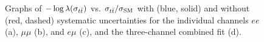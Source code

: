 \begin{figure}[htbp]
  \begin{center}
     \\
     \\
    \caption{Graphs of $-\log\lambda(\sigma_{t\bar{t}})$ vs. $\sigma_{t\bar{t}}/\sigma_{\rm SM}$ with (blue, solid) and without (red, dashed) systematic uncertainties for the individual channels $ee$ (a), $\mu\mu$ (b), and $e\mu$ (c), and the three-channel combined fit (d).}
    \label{fig:dilep_profiles}
  \end{center}
\end{figure}





